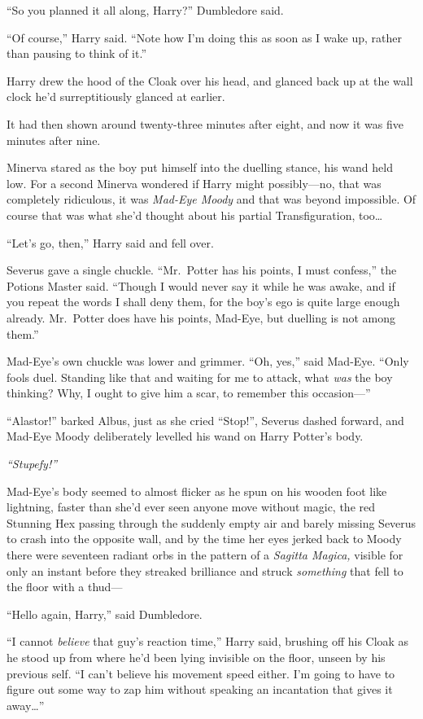 ``So you planned it all along, Harry?'' Dumbledore said.

``Of course,'' Harry said. ``Note how I'm doing this as soon as I wake
up, rather than pausing to think of it.''

Harry drew the hood of the Cloak over his head, and glanced back up at
the wall clock he'd surreptitiously glanced at earlier.

It had then shown around twenty-three minutes after eight, and now it
was five minutes after nine.

Minerva stared as the boy put himself into the duelling stance, his wand
held low. For a second Minerva wondered if Harry might possibly---no,
that was completely ridiculous, it was \emph{Mad-Eye Moody} and that was
beyond impossible. Of course that was what she'd thought about his
partial Transfiguration, too\ldots{}

``Let's go, then,'' Harry said and fell over.

Severus gave a single chuckle. ``Mr.~Potter has his points, I must
confess,'' the Potions Master said. ``Though I would never say it while
he was awake, and if you repeat the words I shall deny them, for the
boy's ego is quite large enough already. Mr.~Potter does have his
points, Mad-Eye, but duelling is not among them.''

Mad-Eye's own chuckle was lower and grimmer. ``Oh, yes,'' said Mad-Eye.
``Only fools duel. Standing like that and waiting for me to attack, what
\emph{was} the boy thinking? Why, I ought to give him a scar, to
remember this occasion---''

``Alastor!'' barked Albus, just as she cried ``Stop!'', Severus dashed
forward, and Mad-Eye Moody deliberately levelled his wand on Harry
Potter's body.

\emph{``Stupefy!''}

Mad-Eye's body seemed to almost flicker as he spun on his wooden foot
like lightning, faster than she'd ever seen anyone move without magic,
the red Stunning Hex passing through the suddenly empty air and barely
missing Severus to crash into the opposite wall, and by the time her
eyes jerked back to Moody there were seventeen radiant orbs in the
pattern of a \emph{Sagitta Magica,} visible for only an instant before
they streaked brilliance and struck \emph{something} that fell to the
floor with a thud---

``Hello again, Harry,'' said Dumbledore.

``I cannot \emph{believe} that guy's reaction time,'' Harry said,
brushing off his Cloak as he stood up from where he'd been lying
invisible on the floor, unseen by his previous self. ``I can't believe
his movement speed either. I'm going to have to figure out some way to
zap him without speaking an incantation that gives it away\ldots{}''

